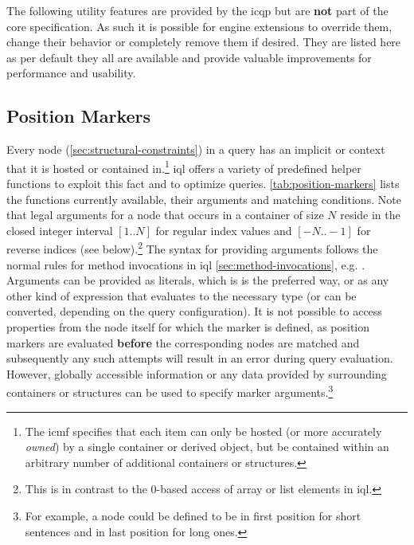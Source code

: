 \documentclass[11pt,a4paper]{article}
\begin{document}
The following utility features are provided by the \ac{icqp} but are \textbf{not} part of the core specification. 
As such it is possible for engine extensions to override them, change their behavior or completely remove them if desired.
They are listed here as per default they all are available and provide valuable improvements for performance and usability.

\subsection{Position Markers}
\label{sec:position-markers}

Every node (\ref{sec:structural-constraints}) in a query has an implicit  or  context that it is hosted  or contained in.\footnote{The \ac{icmf} specifies that each item can only be hosted (or more accurately \textit{owned}) by a single container or derived object, but be contained within an arbitrary number of additional containers or structures.}
\ac{iql} offers a variety of predefined helper functions  to exploit this fact and to optimize queries.
\cref{tab:position-markers} lists the functions currently available, their arguments and matching conditions.
Note that legal arguments for a node that occurs in a container of size $N$ reside in the closed integer interval $[1..N]$ for regular index values and $[-N..-1]$ for reverse indices (see below).\footnote{This is in contrast to the 0-based access of array or list elements in \ac{iql}.}
The syntax for providing arguments follows the normal rules for method invocations in \ac{iql} \ref{sec:method-invocations}, e.g. .
Arguments can be provided as literals, which is is the preferred way, or as any other kind of expression that evaluates to the necessary type (or can be converted, depending on the query configuration).
It is not possible to access properties from the node itself for which the marker is defined, as position markers are evaluated \textbf{before} the corresponding nodes are matched and subsequently any such attempts will result in an error during query evaluation.
However, globally accessible information or any data provided by surrounding containers or structures can be used to specify marker arguments.\footnote{For example, a node could be defined to be in first position for short sentences and in last position for long ones.}
\end{document}
